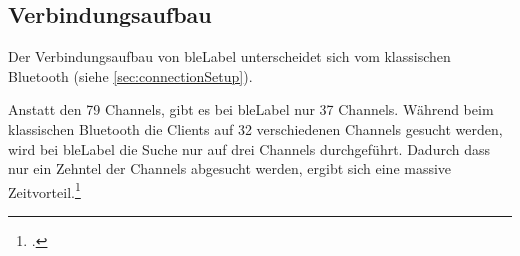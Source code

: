 


\subsection{Verbindungsaufbau}
\label{subsec:bleConnectionSetup}
Der Verbindungsaufbau von \gls{bleLabel} unterscheidet sich vom klassischen Bluetooth (siehe \cref{sec:connectionSetup}).

Anstatt den 79 Channels, gibt es bei \gls{bleLabel} nur 37 Channels. Während beim klassischen Bluetooth die Clients auf 32 verschiedenen Channels gesucht werden, wird bei \gls{bleLabel} die Suche nur auf drei Channels durchgeführt.
Dadurch dass nur ein Zehntel der Channels abgesucht werden, ergibt sich eine massive Zeitvorteil.\footcite[][3]{ti_whitepaper_2015-05-08}



